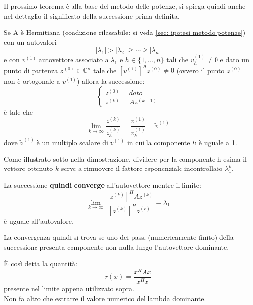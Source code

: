\documentclass[12pt,a4paper,]{report}
\begin{document}
\begin{nota}
    Il prossimo teorema è alla base del metodo delle potenze, si spiega quindi anche nel dettaglio il significato della successione prima definita.
\end{nota}
\begin{teorema}
    Se A è Hermitiana (condizione rilassabile: si veda \ref{sec: ipotesi metodo potenze}) con un autovalori 
    \[|\lambda_1| > |\lambda_2| \geq \cdots \geq |\lambda_n|\]
     e con $v^{(1)}$ autovettore associato a $\lambda_1$ e $h\in\{1, \dots , n\}$ tali che $v^{(1)}_h \ne 0$ e dato un punto di partenza $z^{(0)}\in \mathbb{C}^n$ tale che $\left[ v^{(1)} \right]^H z^{(0)}\ne 0$ (ovvero il punto $z^{(0)}$ non è ortogonale a $v^{(1)}$) allora la successione:
    \[
    \begin{cases}
        z^{(0)} = dato \\
        z^{(k)} = Az^{(k-1)}
    \end{cases}
    \]
    è tale che 
    \[
    \lim_{k\to\infty} \frac{z^{(k)}}{z^{(k)}_h} = \frac{v^{(1)}}{v_h^{(1)}} = \tilde{v}^{(1)}
    \]
    dove $\tilde{v}^{(1)}$ è un multiplo scalare di $v^{(1)}$ in cui la componente $h$ è uguale a 1.\\
    \begin{nota}
        Come illustrato sotto nella dimostrazione, dividere per la componente h-esima il vettore ottenuto $k$ serve a rimuovere il fattore esponenziale incontrollato $\lambda_1^k$.
    \end{nota}
    \noindent
    La successione \textbf{quindi converge} all'autovettore mentre il limite:
    \[
    \lim_{k\to\infty} \frac{[z^{(k)}]^HAz^{(k)}}{[z^{(k)}]^Hz^{(k)}}=\lambda_1
    \]
    è uguale all'autovalore.
\end{teorema}
\begin{nota}
    La convergenza quindi si trova se uno dei passi (numericamente finito) della successione presenta componente non nulla lungo l'autovettore dominante.
\end{nota}

\begin{definizione}
    È così detta la quantità:
    \[
    r(x) = \frac{x^HAx}{x^Hx}
    \]
    presente nel limite appena utilizzato sopra.\\
    Non fa altro che estrarre il valore numerico del lambda dominante.\\
\end{definizione}
\end{document}
